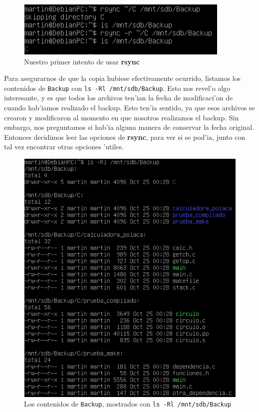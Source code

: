 \documentclass[11pt]{article}
\newcommand{\rsync}[0]{\textbf{rsync}}
\newcommand{\backup}[0]{\texttt{Backup}}
\begin{document}
		\begin{figure}[H]
    			\centering
    			\includegraphics[scale=0.80]{Images/rsync/rsync_backup_first_try.PNG}
    			\caption{Nuestro primer intento de usar \rsync{}}
    			\label{fig:rsync_backup_first_try}
		\end{figure}

		Para asegurarnos de que la copia hubiese efectivamente ocurrido, listamos los contenidos de \backup{} con \texttt{ls -Rl /mnt/sdb/Backup}. Esto nos revel'o algo interesante, y es que todos los archivos ten'ian la fecha de modificaci'on de cuando hab'iamos realizado el backup. Esto ten'ia sentido, ya que esos archivos se crearon y modificaron al momento en que nosotros realizamos el backup. Sin embargo, nos preguntamos si hab'ia alguna manera de conservar la fecha original. Entonces decidimos leer las opciones de \rsync{}, para ver si se pod'ia, junto con tal vez encontrar otras opciones 'utiles.

		\begin{figure}[H]
    			\centering \captionsetup{justification=centering}
    			\includegraphics[scale=0.80]{Images/rsync/rsync_backup_contents.PNG}
    			\caption{Los contenidos de \backup{}, mostrados con \texttt{ls -Rl /mnt/sdb/Backup}}
    			\label{fig:rsync_backup_contents}
		\end{figure}
\end{document}
